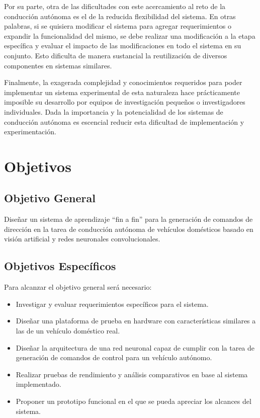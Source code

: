 \documentclass[12pt,letterpaper]{article}
\begin{document}
Por su parte, otra de las dificultades con este acercamiento al reto de la conducción autónoma es el de la reducida
flexibilidad del sistema. En otras palabras, si se quisiera modificar el sistema para agregar requerimientos o 
expandir la funcionalidad del mismo, se debe realizar una modificación a la etapa específica y evaluar el impacto de 
las modificaciones en todo el sistema en su conjunto. Esto dificulta de manera sustancial la reutilización de diversos
componentes en sistemas similares.

Finalmente, la exagerada complejidad y conocimientos requeridos para poder implementar un sistema experimental 
de esta naturaleza hace prácticamente imposible su desarrollo por equipos de investigación pequeños o investigadores 
individuales. Dada la importancia y la potencialidad de los sistemas de conducción autónoma es escencial reducir 
esta dificultad de implementación y experimentación.

\section{Objetivos}
\subsection{Objetivo General}

Diseñar un sistema de aprendizaje “fin a fin” para la generación de comandos de 
dirección en la tarea de conducción autónoma de vehículos domésticos basado en 
visión artificial y redes neuronales convolucionales.

\subsection{Objetivos Específicos}
Para alcanzar el objetivo general será necesario:

\begin{itemize}
    \item Investigar y evaluar requerimientos específicos para el sistema.
    \item Diseñar una plataforma de prueba en hardware con características similares a las de un vehículo doméstico real.
    \item Diseñar la arquitectura de una red neuronal capaz de cumplir con la tarea de generación de comandos 
    de control para un vehículo autónomo.
    \item Realizar pruebas de rendimiento y análisis comparativos en base al sistema implementado.
    \item Proponer un prototipo funcional en el que se pueda apreciar los alcances del sistema.
\end{itemize}
\end{document}
